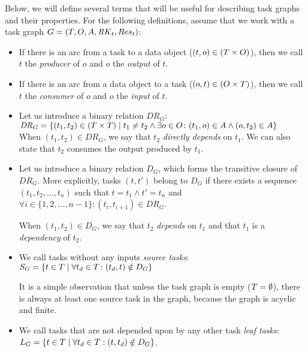 Below, we will define several terms that will be useful for describing task
graphs and their properties. For the following definitions, assume that we work with a
task graph $G = (T, O, A, \mathit{RK}_t, Res_t)$:
\begin{itemize}[itemsep=0pt]
	\item If there is an arc from a task to a data object ($(t,o) \in (T\times{}O)$),
		  then we call
	      $t$ the \emph{producer} of $o$ and
	      $o$ the \emph{output} of $t$.
	\item If there is an arc from a data object to a task ($(o,t) \in (O\times{}T)$), then we
		  call $t$ the \emph{consumer} of $o$ and $o$ the \emph{input} of $t$.

	\item Let us introduce a binary relation $\mathit{DR}_G$: \\
	$\mathit{DR}_G = \{(t_1, t_2)\in{}(T\times{}T) \mid t_1 \neq t_2 \land
		      \exists{}o\in{}O\colon (t_1, o)\in{}A
		      \land (o, t_2)\in{}A\}$ \\ When
	      $(t_1, t_2) \in \mathit{DR}_G$, we say that $t_2$ \emph{directly depends} on
	      $t_1$. We can also state that $t_2$ consumes the output produced
	      by $t_1$.

	\item Let us introduce a binary relation $D_G$, which forms the transitive closure of
	      $\mathit{DR}_G$. More explicitly, tasks $(t, t')$ belong to $D_G$ if there
	      exists a sequence $(t_1, t_2, \ldots, t_n)$ such that $t = t_1 \land t' = t_n$ and
		  $\forall i \in \{1,2,\ldots,n - 1\}: (t_i, t_{i+1}) \in DR_G$.

	      When $(t_1, t_2) \in D_G$, we say that $t_2$ \emph{depends} on
	      $t_1$ and that $t_1$ is a \emph{dependency} of
	      $t_2$.

	\item We call tasks without any inputs \emph{source tasks}: \vspace{1mm}\\ $S_G = \{ t\in{}T \mid
		      \forall{}t_d\in{}T\colon (t_d, t)\notin D_G\}$

		  It is a simple observation that unless the task graph is empty ($T = \emptyset$), there is always at least one source task in the graph, because the graph is acyclic and finite.
	\item We call tasks that are not depended upon by any other task \emph{leaf tasks}: \vspace{1mm}\\
	      $L_G = \{ t\in{}T \mid \forall{}t_d\in{}T: (t, t_d)\notin D_G\}$.
\end{itemize}

